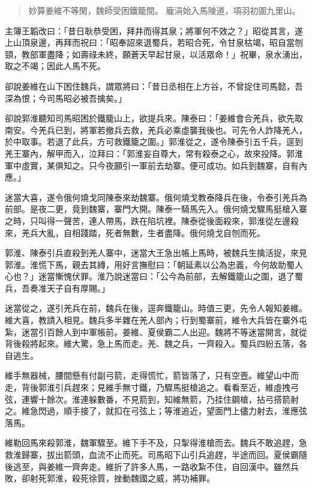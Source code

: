 \begin{quote}
妙算姜維不等閑，魏師受困鐵籠間。
龐涓始入馬陵道，項羽初圍九里山。
\end{quote}

主簿王韜改曰：「昔日耿恭受困，拜井而得其泉；將軍何不效之？」昭從其言，遂上山頂泉邊，再拜而祝曰：「昭奉詔來退蜀兵，若昭合死，令甘泉枯竭，昭自當刎頸，教部軍盡降；如壽祿未終，願蒼天早起甘泉，以活眾命！」祝畢，泉水湧出，取之不竭；因此人馬不死。

卻說姜維在山下困住魏兵，謂眾將曰：「昔日丞相在上方谷，不曾捉住司馬懿，吾深為恨；今司馬昭必被吾擒矣。」

卻說郭淮聽知司馬昭困於鐵籠山上，欲提兵來。陳泰曰：「姜維會合羌兵，欲先取南安。今羌兵已到，將軍若撤兵去救，羌兵必乘虛襲我後也。可先令人詐降羌人，於中取事。若退了此兵，方可救鐵籠之圍。」郭淮從之，遂令陳泰引五千兵，逕到羌王寨內，解甲而入，泣拜曰：「郭淮妄自尊大，常有殺泰之心，故來投降。郭淮軍中虛實，某俱知之。只今夜願引一軍前去劫寨。便可成功。如兵到魏寨，自有內應。」

迷當大喜，遂令俄何燒戈同陳泰來劫魏寨。俄何燒戈教泰降兵在後，令泰引羌兵為前部。是夜二更，竟到魏寨，寨門大開。陳泰一騎馬先入。俄何燒戈驟馬挺槍入寨之時，只叫得一聲苦，連人帶馬，跌在陷坑裡。陳泰從後面殺來，郭淮從左邊殺來，羌兵大亂，自相踐踏，死者無數，生者盡降。俄何燒戈自刎而死。

郭淮、陳泰引兵直殺到羌人寨中，迷當大王急出帳上馬時，被魏兵生擒活捉，來見郭淮。淮慌下馬，親去其縳，用好言撫慰曰：「朝延素以公為忠義，今何故助蜀人心也？」迷當慚愧伏罪。淮乃說迷當曰：「公今為前部，去解鐵籠山之圍，退了蜀兵，吾奏准天子自有厚賜。」

迷當從之，遂引羌兵在前，魏兵在後，逕奔鐵籠山。時值三更，先令人報知姜維。維大喜，教請入相見。魏兵多半雜在羌人部內；行到蜀寨前，維令大兵皆在寨外屯紮，迷當引百餘人到中軍帳前。姜維、夏侯霸二人出迎。魏將不等迷當開言，就從背後殺將起來。維大驚，急上馬而走。羌、魏之兵，一齊殺入。蜀兵四紛五落，各自逃生。

維手無器械，腰間懸有付副弓箭，走得慌忙，箭皆落了，只有空壼。維望山中而走，背後郭淮引兵趕來；見維手無寸鐵，乃驟馬挺槍追之。看看至近，維虛拽弓弦，連響十餘次。淮連躲數番，不見箭到，知維無箭，乃挂住鋼槍，拈弓搭箭射之。維急閃過，順手接了，就扣在弓弦上；等淮追近，望面門上儘力射去，淮應弦落馬。

維勒回馬來殺郭淮，魏軍驟至。維下手不及，只掣得淮槍而去。魏兵不敢追趕，急救淮歸寨，拔出箭頭，血流不止而死。司馬昭下山引兵追趕，半途而回。夏侯霸隨後逃至，與姜維一齊奔走。維折了許多人馬，一路收紮不住，自回漢中。雖然兵敗，卻射死郭淮，殺死徐質，挫動魏國之威，將功補罪。

